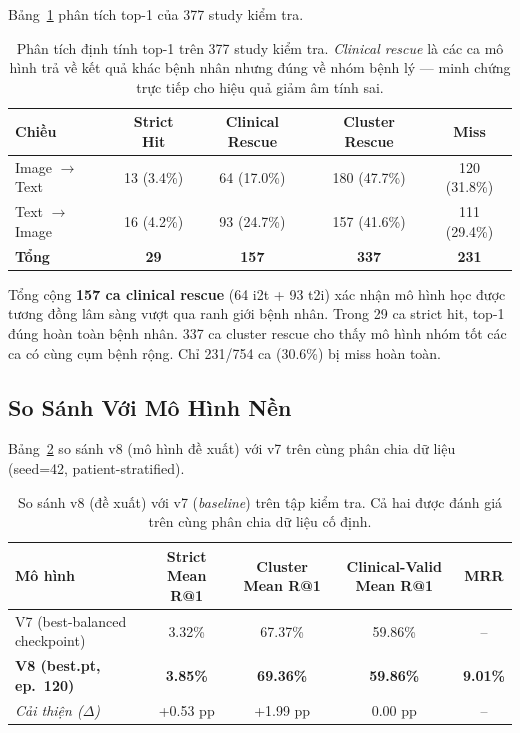 \documentclass[12pt, a4paper]{article}
\begin{document}
Bảng~\ref{tab:bucket} phân tích top-1 của 377 study kiểm tra.

\begin{table}[H]
  \centering
  \caption{Phân tích định tính top-1 trên 377 study kiểm tra. \textit{Clinical
    rescue} là các ca mô hình trả về kết quả khác bệnh nhân nhưng đúng về
    nhóm bệnh lý --- minh chứng trực tiếp cho hiệu quả giảm âm tính sai.}
  \label{tab:bucket}
  \begin{tabular}{lcccc}
    \toprule
    \textbf{Chiều} &
    \textbf{Strict Hit} &
    \textbf{Clinical Rescue} &
    \textbf{Cluster Rescue} &
    \textbf{Miss} \\
    \midrule
    Image $\to$ Text & 13 (3.4\%)  & 64 (17.0\%) & 180 (47.7\%) & 120 (31.8\%) \\
    Text $\to$ Image & 16 (4.2\%)  & 93 (24.7\%) & 157 (41.6\%) & 111 (29.4\%) \\
    \midrule
    \textbf{Tổng}    & \textbf{29} & \textbf{157} & \textbf{337} & \textbf{231} \\
    \bottomrule
  \end{tabular}
\end{table}

Tổng cộng \textbf{157 ca clinical rescue} (64 i2t + 93 t2i) xác nhận mô hình
học được tương đồng lâm sàng vượt qua ranh giới bệnh nhân. Trong 29 ca strict
hit, top-1 đúng hoàn toàn bệnh nhân. 337 ca cluster rescue cho thấy mô hình
nhóm tốt các ca có cùng cụm bệnh rộng. Chỉ 231/754 ca (30.6\%) bị miss hoàn
toàn.

\subsection{So Sánh Với Mô Hình Nền}
\label{sec:comparison}

Bảng~\ref{tab:comparison} so sánh v8 (mô hình đề xuất) với v7 trên cùng
phân chia dữ liệu (seed=42, patient-stratified).

\begin{table}[H]
  \centering
  \caption{So sánh v8 (đề xuất) với v7 (\textit{baseline}) trên tập kiểm tra.
    Cả hai được đánh giá trên cùng phân chia dữ liệu cố định.}
  \label{tab:comparison}
  \begin{tabular}{l cccc}
    \toprule
    \textbf{Mô hình} &
    \textbf{Strict Mean R@1} &
    \textbf{Cluster Mean R@1} &
    \textbf{Clinical-Valid Mean R@1} &
    \textbf{MRR} \\
    \midrule
    V7 (best-balanced checkpoint)
      & 3.32\% & 67.37\% & 59.86\% & -- \\
    \textbf{V8 (best.pt, ep.~120)}
      & \textbf{3.85\%} & \textbf{69.36\%} & \textbf{59.86\%} & \textbf{9.01\%} \\
    \midrule
    \textit{Cải thiện ($\Delta$)}
      & +0.53 pp & +1.99 pp & 0.00 pp & -- \\
    \bottomrule
  \end{tabular}
\end{table}
\end{document}
